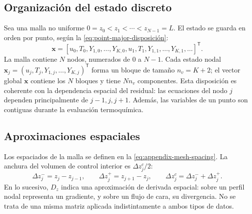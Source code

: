 \documentclass[12pt,a4paper,twoside,openany]{book}
\newcommand{\vect}[1]{\bm{#1}}
\begin{document}
\subsection{Organización del estado discreto}

Sea una malla no uniforme \(0=z_0<z_1<\cdots<z_{N-1}=L\). El estado se guarda en
orden por punto, según la \cref{eq:point-major-disposición}:
\begin{equation}
  \vect{x}=\left[
  u_0,T_0,Y_{1,0},\ldots,Y_{K,0},
  u_1,T_1,Y_{1,1},\ldots,Y_{K,1},\ldots
  \right]^{\mathsf T}.
  \label{eq:point-major-disposición}
\end{equation}
La malla contiene \(N\) nodos, numerados de \(0\) a \(N-1\).
Cada estado nodal \(\vect x_j=(u_j,T_j,Y_{1,j},\ldots,Y_{K,j})^{\mathsf T}\)
forma un bloque de tamaño \(n_v=K+2\); el vector global \(\vect x\) contiene
los \(N\) bloques y tiene \(Nn_v\) componentes. Esta disposición es coherente
con la dependencia espacial del residual: las ecuaciones del nodo \(j\) dependen
principalmente de \(j-1,j,j+1\). Además, las variables de un punto son contiguas
durante la evaluación termoquímica.

\subsection{Aproximaciones espaciales}

Los espaciados de la malla se definen en la \cref{eq:appendix-mesh-spacing}.
La anchura del volumen de control interior es \(\Delta z_j^c/2\):
\begin{equation}
 \Delta z_j^-=z_j-z_{j-1},\qquad
 \Delta z_j^+=z_{j+1}-z_j,\qquad
 \Delta z_j^c=\Delta z_j^-+\Delta z_j^+.
 \label{eq:appendix-mesh-spacing}
\end{equation}
En lo sucesivo, \(D_z\) indica una aproximación de derivada espacial:
sobre un perfil nodal representa un gradiente, y sobre un flujo de cara,
su divergencia. No se trata de una misma matriz aplicada indistintamente
a ambos tipos de datos.
\end{document}
